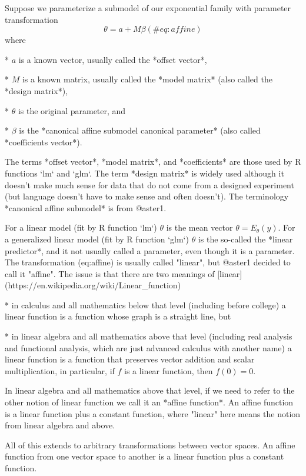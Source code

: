 \documentclass[11pt]{article}
\begin{document}
Suppose we parameterize a submodel of our exponential family with
parameter transformation
\begin{equation}
   \theta = a + M \beta
   (\#eq:affine)
\end{equation}
where

 * $a$ is a known vector, usually called the *offset vector*,

 * $M$ is a known matrix, usually called the *model matrix*
   (also called the *design matrix*),

 * $\theta$ is the original parameter, and

 * $\beta$ is the *canonical affine submodel canonical parameter*
   (also called *coefficients vector*).

The terms *offset vector*, *model matrix*, and *coefficients*
are those used by R functions `lm` and `glm`.  The term *design matrix*
is widely used although it doesn't make much sense for data that do not
come from a designed experiment (but language doesn't have to make sense
and often doesn't).  The terminology *canonical affine submodel* is from
@aster1.

For a linear model (fit by R function `lm`) $\theta$ is the mean vector
$\theta = E_\theta(y)$.
For a generalized linear model (fit by R function `glm`) $\theta$ is the
so-called the *linear predictor*, and it not usually called a parameter, even
though it is a parameter.
The transformation \@ref(eq:affine) is usually called "linear",
but @aster1 decided to call it "affine".
The issue is that there are two meanings of
[linear](https://en.wikipedia.org/wiki/Linear_function)

 * in calculus and all mathematics below that level (including before college)
   a linear function is a function whose graph is a straight line, but

 * in linear algebra and all mathematics above that level (including real
   analysis and functional analysis, which are just advanced calculus
   with another name) a linear function is a function that preserves
   vector addition and scalar multiplication, in particular, if $f$ is
   a linear function, then $f(0) = 0$.

In linear algebra and all mathematics above that level, if we need to
refer to the other notion of linear function we call it an *affine function*.
An affine function is a linear function plus a constant function, where
"linear" here means the notion from linear algebra and above.

All of this extends to arbitrary transformations between vector spaces.
An affine function from one vector space to another is a linear function
plus a constant function.
\end{document}
